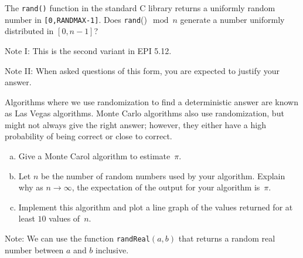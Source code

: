 \documentclass{article}
\begin{document}
\nextprob
The \texttt{rand()} function in the standard C library returns a
uniformly random number in \texttt{[0,RANDMAX-1]}. Does \texttt{rand}()$\mod n$
generate a number uniformly distributed in $[0,n-1]$?

Note I: This is the second variant in EPI 5.12.

Note II: When asked questions of this form, you are expected to justify your
answer.

\nextprob

Algorithms where we use randomization to find a deterministic answer are known
as Las Vegas algorithms.  Monte Carlo algorithms also use randomization, but
might not always give the right answer; however, they either have a high
probability of being correct or close to correct.

\begin{enumerate}[(a)]
\item Give a Monte Carol algorithm to estimate~$\pi$.
\item Let $n$ be the number of random numbers used by your algorithm.
Explain why as $n \to \infty$, the expectation of the output for your
algorithm is~$\pi$.
\item Implement this algorithm and plot a line graph of
the values returned for at least $10$ values of~$n$.
\end{enumerate}

Note: We can use the function \texttt{randReal}$(a,b)$ that returns a random
real number between $a$ and $b$ inclusive.
\end{document}
